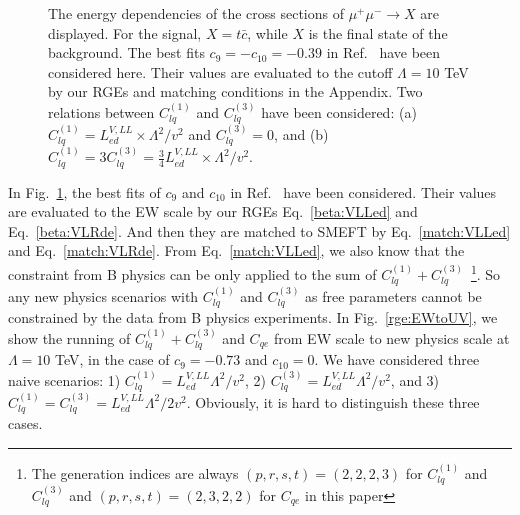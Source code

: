 \documentclass[a4paper,11pt]{article}
\begin{document}
\begin{figure}
  \centering
  \caption{The energy dependencies of the cross sections of $\mu^+\mu^-\to X$ are displayed. For the signal, $X=t\bar{c}$, while $X$ is the final state of the background. The best fits $c_{9}=-c_{10}=-0.39$ in Ref.~\cite{Altmannshofer:2021qrr} have been considered here. Their values are evaluated to the cutoff $\Lambda=10$ TeV by our RGEs and matching conditions in the Appendix. Two relations between $C^{(1)}_{lq}$ and $C^{(3)}_{lq}$ have been considered: (a) $C^{(1)}_{lq}=L^{V,LL}_{ed}\times \Lambda^2/v^2$ and $C^{(3)}_{lq}=0$, and (b) $C^{(1)}_{lq}=3C^{(3)}_{lq}=\frac{3}{4}L^{V,LL}_{ed}\times \Lambda^2/v^2$.\label{ecm}}
\end{figure}

In Fig.~\ref{ecm}, the best fits of $c_{9}$ and $c_{10}$ in Ref.~\cite{Altmannshofer:2021qrr} have been considered. 
Their values are evaluated to the EW scale by our RGEs Eq.~\ref{beta:VLLed} and Eq.~\ref{beta:VLRde}. 
And then they are matched to SMEFT by Eq.~\ref{match:VLLed} and Eq.~\ref{match:VLRde}. 
From Eq.~\ref{match:VLLed}, we also know that the constraint from B physics can be only applied to the sum of $C^{(1)}_{lq}+C^{(3)}_{lq}$~\footnote{The generation indices are always $(p,r,s,t)=(2,2,2,3)$ for $C^{(1)}_{lq}$ and $C^{(3)}_{lq}$ and $(p,r,s,t)=(2,3,2,2)$ for $C_{qe}$ in this paper}.  
So any new physics scenarios with $C^{(1)}_{lq}$ and $C^{(3)}_{lq}$ as free parameters cannot be constrained by the data from B physics experiments. 
In Fig.~\ref{rge:EWtoUV}, we show the running of $C^{(1)}_{lq}+C^{(3)}_{lq}$ and $C_{qe}$ from EW scale to new physics scale at $\Lambda=10$ TeV, 
in the case of $c_{9}=-0.73$ and $c_{10}=0$.
We have considered three naive scenarios: 1) $C^{(1)}_{lq}=L^{V,LL}_{ed}\Lambda^2/v^2$, 2) $C^{(3)}_{lq}=L^{V,LL}_{ed}\Lambda^2/v^2$, and 3) $C^{(1)}_{lq}=C^{(3)}_{lq}=L^{V,LL}_{ed}\Lambda^2/2v^2$.
Obviously, it is hard to distinguish these three cases. 
\end{document}
